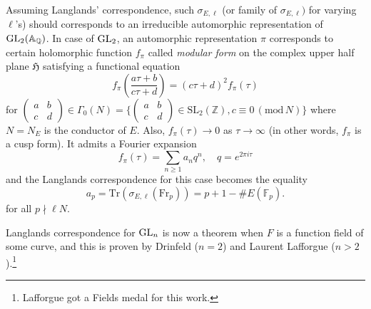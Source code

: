 Assuming Langlands' correspondence, such $\sigma_{E, \ell}$ (or family of $\sigma_{E, \ell})$ for varying $\ell$'s) should corresponds
to an irreducible automorphic representation of $\operatorname{\mathrm{GL}}_{2}(\mathbb{A}_{\mathbb{Q}})$.
In case of $\operatorname{\mathrm{GL}}_{2}$, an automorphic representation $\pi$ corresponds to certain holomorphic function $f_{\pi}$ called \emph{modular form} on
the complex upper half plane $\mathfrak{H}$ satisfying a functional equation
$$
    f_{\pi} \left(\frac{a\tau + b}{c\tau + d}\right) = (c\tau + d)^{2}f_{\pi}(\tau)
$$
for $(\begin{smallmatrix} a & b \\ c & d\end{smallmatrix}) \in \Gamma_{0}(N) = \{(\begin{smallmatrix} a &b \\ c & d\end{smallmatrix}) \in \mathrm{SL}_{2}(\mathbb{Z}), c\equiv 0\,(\mathrm{mod}\,N)\}$
where $N = N_{E}$ is the conductor of $E$.
Also, $f_{\pi}(\tau)  \to 0$ as $\tau \to \infty$ (in other words, $f_{\pi}$ is a cusp form).
It admits a Fourier expansion
$$
    f_{\pi}(\tau) = \sum_{n\geq 1} a_{n} q^{n}, \quad q = e^{2 \pi i \tau}
$$
and the Langlands correspondence for this case becomes the equality
$$
a_{p} = \mathrm{Tr}(\sigma_{E, \ell}(\mathrm{Fr}_p)) = p + 1 - \# E(\mathbb{F}_{p}).
$$
for all $p \nmid \ell N$.

Langlands correspondence for $\operatorname{\mathrm{GL}}_n$ is now a theorem when $F$ is a function field of some curve, and this is proven by Drinfeld ($n = 2$) and Laurent Lafforgue ($n>2$).\footnote{Lafforgue got a Fields medal for this work.}
